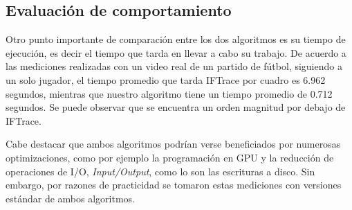 \subsection{Evaluación de comportamiento}

Otro punto importante de comparación entre los dos algoritmos es su tiempo de ejecución, es decir el tiempo que tarda en llevar a cabo su trabajo.
De acuerdo a las mediciones realizadas con un video real de un partido de fútbol, siguiendo a un solo jugador, el tiempo promedio que
tarda IFTrace por cuadro es 6.962 segundos, mientras que nuestro algoritmo tiene un tiempo promedio de 0.712 segundos. Se puede observar que
se encuentra un orden magnitud por debajo de IFTrace.

Cabe destacar que ambos algoritmos podrían verse beneficiados por numerosas optimizaciones, como por ejemplo la programación
en GPU y la reducción de operaciones de I/O, \textit{Input/Output}, como lo son las escrituras a disco. Sin embargo, por razones de
practicidad se tomaron estas mediciones con versiones estándar de ambos algoritmos.

